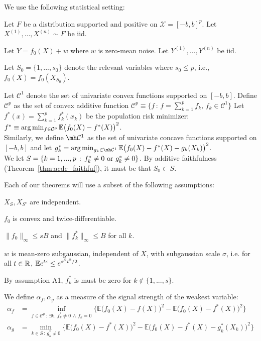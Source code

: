 We use the following statistical setting:

\begin{packed_enum}
\item Let $F$ be a distribution supported and positive on $\mathcal{X}=[-b,b]^p$. Let $X^{(1)},..., X^{(n)} \sim F$ be iid.
\item Let $Y = f_0(X) + w$ where $w$ is zero-mean noise. Let $Y^{(1)},...,Y^{(n)}$ be iid.
\item Let $S_0 = \{1,...,s_0\}$ denote the relevant variables where $s_0 \leq p$, i.e.,
  $f_0(X) = f_0(X_{S_0})$.
\end{packed_enum}


Let $\mathcal{C}^1$ denote the set of univariate convex functions supported on $[-b,b]$. Define $\mathcal{C}^{p}$ as the set of convex additive function
$\mathcal{C}^p \equiv \{ f \,:\, f = \sum_{k=1}^p f_k, \,
   f_k \in \mathcal{C}^1 \} $
Let $f^*(x) = \sum_{k=1}^p f^*_k(x_k)$ be the population risk minimizer:
$f^* \equiv \arg\min_{f \in \mathcal{C}^p} {\mathbb E}\big(f_0(X) - f^*(X) \big)^2$.\\

Similarly, we define $\mh \mathcal{C}^1$ as the set of univariate concave functions supported on $[-b, b]$ and let 
$g^*_k = \arg\min_{g_k \in \mh \mathcal{C}^1} \E \big( f_0(X) - f^*(X) - g_k(X_k) \big)^2$. \\

We let $S = \{ k = 1,...,p \,:\, f^*_k \neq 0 \textrm{ or } g^*_k \neq 0\}$. By additive faithfulness (Theorem~\ref{thm:acdc_faithful}), it must be that $S_0 \subset S$. 


Each of our theorems will use a subset of the following assumptions:
\begin{packed_enum}
\item[A1:] $X_S, X_{S^c}$ are independent. 
\item[A2:] $f_0$ is convex and twice-differentiable. 
\item[A3:] $\|f_0\|_\infty \leq sB$ and $\| f^*_k \|_\infty \leq B$ for all $k$.
\item[A4:] $w$ is mean-zero subgaussian, independent of $X$, with subgaussian scale $\sigma$, i.e. for all $t \in {\mathbb R}$, ${\mathbb E} e^{t \epsilon} \leq e^{\sigma^2 t^2 / 2}$.
\end{packed_enum}
By assumption A1, $f^*_k$ is must be zero for $k\notin \{1,...,s\}$. 


We define $\alpha_f, \alpha_g$ as a measure of the signal strength of the weakest variable:
\begin{align*}
\alpha_f &= \inf_{f \in \mathcal{C}^p \,:\, \exists k ,\, f^*_k \neq 0 \,\wedge\, f_k = 0} 
       \Big\{ \mathbb{E} \big( f_0(X) - f(X) \big)^2 - 
        \mathbb{E} \big( f_0(X) - f^*(X) \big)^2  \Big\}\\
\alpha_g &=   \min_{k \in S \,:\, g^*_k \neq 0}
      \Big\{ \mathbb{E} \big( f_0(X) - f^*(X) \big)^2 - 
    \mathbb{E} \big( f_0(X) - f^*(X) - g^*_k(X_k) \big)^2 \Big\}
\end{align*}

